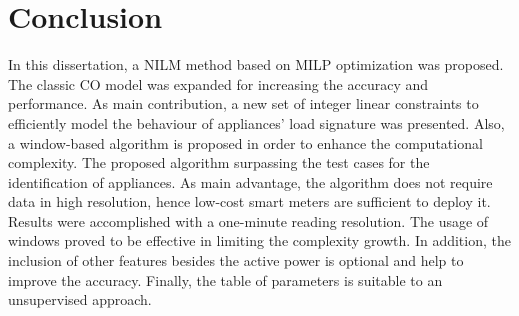 
\chapter{Conclusion}
In this dissertation, a NILM method based on MILP optimization was proposed. The classic CO model was expanded for increasing the accuracy and performance. As main contribution, a new set of integer linear constraints to efficiently model the behaviour of appliances' load signature was presented. Also, a window-based algorithm is proposed in order to enhance the computational complexity. The proposed algorithm surpassing the test cases for the identification of appliances. As main advantage, the algorithm does not require data in high resolution, hence low-cost smart meters are sufficient to deploy it. Results were accomplished with a one-minute reading resolution. The usage of windows proved to be effective in limiting the complexity growth. In addition, the inclusion of other features besides the active power is optional and help to improve the accuracy. Finally, the table of parameters is suitable to an unsupervised approach. 

\iffalse

\section{Future directions}
The following list shows points that might be considered for future work in this area

\begin{itemize}
\item Communication of time between windows: What could help is to implement an intermediary window. For example, if the window size is 10, we could make the solver run every 5 measurements ahead. 
\item Implement probabilistic functions: for example, penalization for turning on on unlikely times (like a washing machine at 3 AM). 
\item Implement the concept of occupied and non-occupied type of loads: Associate a low probability of human operated appliances during the dawn. 
\end{itemize}
\fi